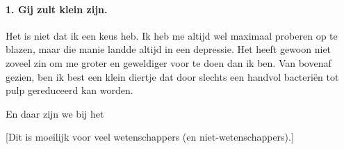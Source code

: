 \documentclass[12pt,a4paper]{article}
\begin{document}
\paragraph{1. Gij zult klein zijn.} Het is niet dat ik een keus heb. Ik heb me altijd wel maximaal proberen op te blazen, maar die manie landde altijd in een depressie. Het heeft gewoon niet zoveel zin om me groter en geweldiger voor te doen dan ik ben. Van bovenaf gezien, ben ik best een klein diertje dat door slechts een handvol bacteriën tot pulp gereduceerd kan worden.

En daar zijn we bij het 

[Dit is moeilijk voor veel wetenschappers (en niet-wetenschappers).]
\end{document}
